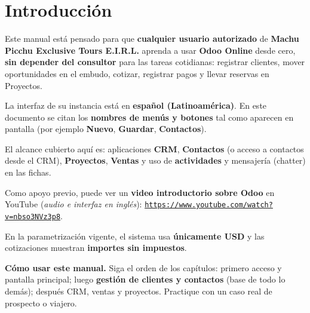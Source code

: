 \section{Introducción}

Este manual está pensado para que \textbf{cualquier usuario autorizado} de \textbf{Machu Picchu Exclusive Tours E.I.R.L.} aprenda a usar \textbf{Odoo Online} desde cero, \textbf{sin depender del consultor} para las tareas cotidianas: registrar clientes, mover oportunidades en el embudo, cotizar, registrar pagos y llevar reservas en Proyectos.

La interfaz de su instancia está en \textbf{español (Latinoamérica)}. En este documento se citan los \textbf{nombres de menús y botones} tal como aparecen en pantalla (por ejemplo \textbf{Nuevo}, \textbf{Guardar}, \textbf{Contactos}).

El alcance cubierto aquí es: aplicaciones \textbf{CRM}, \textbf{Contactos} (o acceso a contactos desde el CRM), \textbf{Proyectos}, \textbf{Ventas} y uso de \textbf{actividades} y mensajería (chatter) en las fichas.

Como apoyo previo, puede ver un \textbf{video introductorio sobre Odoo} en YouTube (\textit{audio e interfaz en inglés}): \href{https://www.youtube.com/watch?v=nbso3NVz3p8}{\texttt{https://www.youtube.com/watch?v=nbso3NVz3p8}}.

En la parametrización vigente, el sistema usa \textbf{únicamente USD} y las cotizaciones muestran \textbf{importes sin impuestos}.

\textbf{Cómo usar este manual.} Siga el orden de los capítulos: primero acceso y pantalla principal; luego \textbf{gestión de clientes y contactos} (base de todo lo demás); después CRM, ventas y proyectos. Practique con un caso real de prospecto o viajero.
